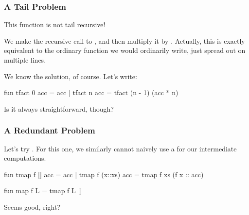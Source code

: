 \documentclass[aspectratio=169, handout]{beamer}
\begin{document}
\begin{frame}[fragile]
  \frametitle{A Tail Problem}

  This function is not tail recursive!

  \pause
  \vspace{\fill}

  We make the recursive call to , and then multiply it by
  . Actually, this is exactly equivalent to the ordinary 
  function we would ordinarily write, just spread out on multiple lines.

  \pause
  \vspace{\fill}

  We know the solution, of course. Let's write:
  \begin{codeblock}
    fun tfact 0 acc = acc
      | tfact n acc = tfact (n - 1) (acc * n)
  \end{codeblock}

  \pause
  \vspace{\fill}

  Is it always straightforward, though?
\end{frame}

\begin{frame}[fragile]
  \frametitle{A Redundant Problem}

  Let's try . For this one, we similarly cannot
  naively use a  for our intermediate computations.

  \pause
  \vspace{\fill}

  \begin{codeblock}
    fun tmap f [] acc = acc
      | tmap f (x::xs) acc = tmap f xs (f x :: acc)

    fun map f L = tmap f L []
  \end{codeblock}

  Seems good, right?

  \pause
  \vspace{\fill}

\end{frame}
\end{document}
